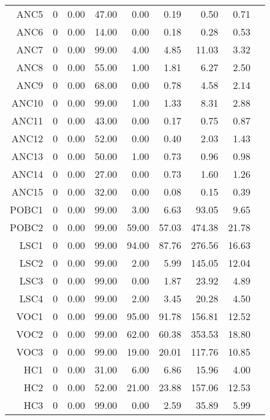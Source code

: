 \begin{longtable}{|rrrrrrrrr|}
	ANC5  &  0  &  0.00  &  47.00  &  0.00  &  0.19  &  0.50  &  0.71 & \\
	ANC6  &  0  &  0.00  &  14.00  &  0.00  &  0.18  &  0.28  &  0.53 & \\
	ANC7  &  0  &  0.00  &  99.00  &  4.00  &  4.85  &  11.03  &  3.32 & \\
	ANC8  &  0  &  0.00  &  55.00  &  1.00  &  1.81  &  6.27  &  2.50 & \\
	ANC9  &  0  &  0.00  &  68.00  &  0.00  &  0.78  &  4.58  &  2.14 & \\
	ANC10  &  0  &  0.00  &  99.00  &  1.00  &  1.33  &  8.31  &  2.88 & \\
	ANC11  &  0  &  0.00  &  43.00  &  0.00  &  0.17  &  0.75  &  0.87 & \\
	ANC12  &  0  &  0.00  &  52.00  &  0.00  &  0.40  &  2.03  &  1.43 & \\
	ANC13  &  0  &  0.00  &  50.00  &  1.00  &  0.73  &  0.96  &  0.98 & \\
	ANC14  &  0  &  0.00  &  27.00  &  0.00  &  0.73  &  1.60  &  1.26 & \\
	ANC15  &  0  &  0.00  &  32.00  &  0.00  &  0.08  &  0.15  &  0.39 & \\
	POBC1  &  0  &  0.00  &  99.00  &  3.00  &  6.63  &  93.05  &  9.65 & \\
	POBC2  &  0  &  0.00  &  99.00  &  59.00  &  57.03  &  474.38  &  21.78 & \\
	LSC1  &  0  &  0.00  &  99.00  &  94.00  &  87.76  &  276.56  &  16.63 & \\
	LSC2  &  0  &  0.00  &  99.00  &  2.00  &  5.99  &  145.05  &  12.04 & \\
	LSC3  &  0  &  0.00  &  99.00  &  0.00  &  1.87  &  23.92  &  4.89 & \\
	LSC4  &  0  &  0.00  &  99.00  &  2.00  &  3.45  &  20.28  &  4.50 & \\
	VOC1  &  0  &  0.00  &  99.00  &  95.00  &  91.78  &  156.81  &  12.52 & \\
	VOC2  &  0  &  0.00  &  99.00  &  62.00  &  60.38  &  353.53  &  18.80 & \\
	VOC3  &  0  &  0.00  &  99.00  &  19.00  &  20.01  &  117.76  &  10.85 & \\
	HC1  &  0  &  0.00  &  31.00  &  6.00  &  6.86  &  15.96  &  4.00 & \\
	HC2  &  0  &  0.00  &  52.00  &  21.00  &  23.88  &  157.06  &  12.53 & \\
	HC3  &  0  &  0.00  &  99.00  &  0.00  &  2.59  &  35.89  &  5.99 & \\

\end{longtable}
